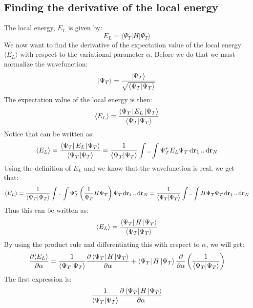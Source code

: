 \documentclass[a4paper, 10pt]{article}
\begin{document}
\begin{appendices}
		\section{Finding the derivative of the local energy}\label{ap:derivative_of_local_energy}
		The local energy, $E_L$ is given by:
		\begin{equation}
		E_L=\langle \Psi_T | H| \Psi_T \rangle
		\end{equation}
We now want to find the derivative of the expectation value of the local energy $\langle E_{L}\rangle$
with respect to the variational parameter $\alpha$. Before we do that we must normalize the wavefunction:
\begin{align}
\ket{\Psi_{T}} = \frac{\ket{\Psi_{T}}}{\sqrt{\braket{\Psi_{T}}}}
\end{align}
The expectation value of the local energy is then:
\begin{align}
\langle E_{L} \rangle = \frac{\bra{\Psi_{T}}E_{L}\ket{\Psi_{T}}}{\braket{\Psi_{T}}}
\end{align}
Notice that can be written as:
\begin{align}
\langle E_{L} \rangle = \frac{\bra{\Psi_{T}}E_{L}\ket{\Psi_{T}}}{\braket{\Psi_{T}}}
= \frac{1}{\braket{\Psi_{T}}}\int..\int \Psi_{T}^{*}E_{L}\Psi_{T}\dd{\bold{r}_{1}}..\dd{\bold{r}_{N}}
\end{align}
Using the definition of $E_{L}$ and we know that the wavefunction is real, we get that:
\begin{align}
\langle E_{L} \rangle = \frac{1}{\braket{\Psi_{T}}}\int..\int \Psi_{T}^{*}\left(\frac{1}{\Psi_{T}}H\Psi_{T}\right)\Psi_{T}\dd{\bold{r}_{1}}..\dd{\bold{r}_{N}}
= \frac{1}{\braket{\Psi_{T}}}\int..\int H\Psi_{T}\Psi_{T}\dd{\bold{r}_{1}}..\dd{\bold{r}_{N}}
\end{align}
Thus this can be written as:
\begin{align}
\langle E_{L} \rangle = \frac{\bra{\Psi_{T}}H\ket{\Psi_{T}}}{\braket{\Psi_{T}}}
\end{align}
By using the product rule and differentiating this with respect to $\alpha$,
we will get:
\begin{align}
\pdv{\langle E_{L} \rangle }{\alpha} = \frac{1}{\braket{\Psi_{T}}}\pdv{\bra{\Psi_{T}}H\ket{\Psi_{T}}}{\alpha}
+ \bra{\Psi_{T}}H\ket{\Psi_{T}}\pdv{\alpha}\left(\frac{1}{\braket{\Psi_{T}}}\right)
\label{proddiff}
\end{align}
The first expression is:
\begin{align}
\frac{1}{\braket{\Psi_{T}}}\pdv{\bra{\Psi_{T}}H\ket{\Psi_{T}}}{\alpha}

\end{align}
\end{appendices}
\end{document}
